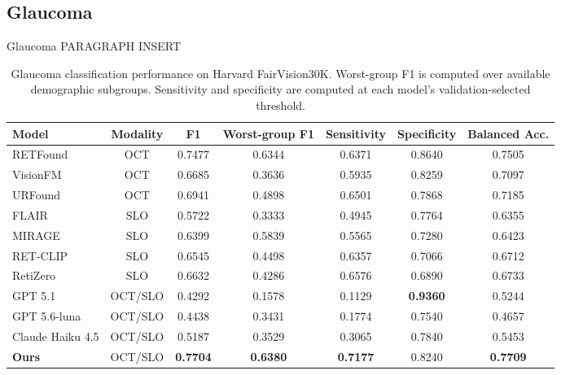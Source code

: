 \subsection{Glaucoma}
Glaucoma PARAGRAPH INSERT
\begin{table}[h]
\centering
\caption{Glaucoma classification performance on Harvard FairVision30K. Worst-group F1 is computed over available demographic subgroups. Sensitivity and specificity are computed at each model's validation-selected threshold.}
\label{tab:glaucoma_fairvision30k}
\begin{tabular}{lcccccc}
\toprule
\textbf{Model} & \textbf{Modality} & \textbf{F1} & \textbf{Worst-group F1} & \textbf{Sensitivity} & \textbf{Specificity} & \textbf{Balanced Acc.} \\
\midrule
RETFound & OCT & 0.7477 & 0.6344 & 0.6371 & 0.8640 & 0.7505 \\
VisionFM & OCT & 0.6685 & 0.3636 & 0.5935 & 0.8259 & 0.7097 \\
URFound & OCT & 0.6941 & 0.4898 & 0.6501 & 0.7868 & 0.7185 \\
FLAIR & SLO & 0.5722 & 0.3333 & 0.4945 & 0.7764 & 0.6355 \\
MIRAGE & SLO & 0.6399 & 0.5839 & 0.5565 & 0.7280 & 0.6423 \\
RET-CLIP & SLO & 0.6545 & 0.4498 & 0.6357 & 0.7066 & 0.6712 \\
RetiZero & SLO & 0.6632 & 0.4286 & 0.6576 & 0.6890 & 0.6733 \\
GPT 5.1 & OCT/SLO & 0.4292 & 0.1578 & 0.1129 & \textbf{0.9360} & 0.5244 \\
GPT 5.6-luna & OCT/SLO & 0.4438 & 0.3431 & 0.1774 & 0.7540 & 0.4657 \\
Claude Haiku 4.5 & OCT/SLO & 0.5187 & 0.3529 & 0.3065 & 0.7840  & 0.5453 \\
\textbf{Ours} & OCT/SLO & \textbf{0.7704} & \textbf{0.6380} & \textbf{0.7177} & 0.8240 & \textbf{0.7709} \\
\bottomrule
\end{tabular}
\end{table}

